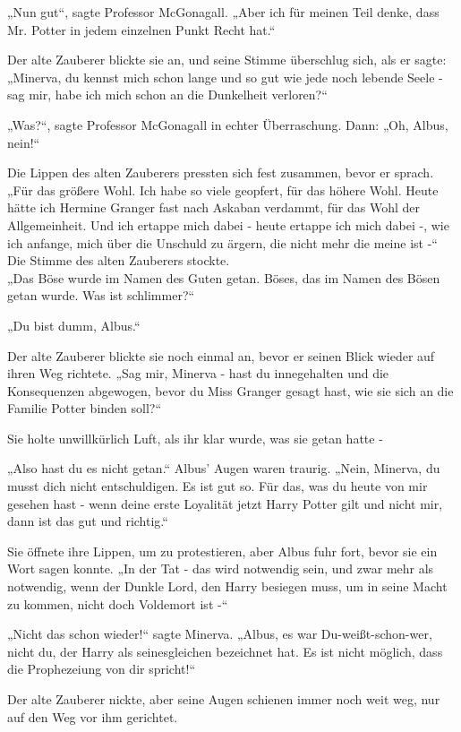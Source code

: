 {„Nun gut“, sagte Professor McGonagall. „Aber ich für meinen Teil denke, dass Mr. Potter in jedem einzelnen Punkt Recht hat.“

Der alte Zauberer blickte sie an, und seine Stimme überschlug sich, als er sagte: „Minerva, du kennst mich schon lange und so gut wie jede noch lebende Seele - sag mir, habe ich mich schon an die Dunkelheit verloren?“

„Was?“, sagte Professor McGonagall in echter Überraschung. Dann: „Oh, Albus, nein!“

Die Lippen des alten Zauberers pressten sich fest zusammen, bevor er sprach.\\ „Für das größere Wohl. Ich habe so viele geopfert, für das höhere Wohl. Heute hätte ich Hermine Granger fast nach Askaban verdammt, für das Wohl der Allgemeinheit. Und ich ertappe mich dabei - heute ertappe ich mich dabei -, wie ich anfange, mich über die Unschuld zu ärgern, die nicht mehr die meine ist -“\\ Die Stimme des alten Zauberers stockte.\\ „Das Böse wurde im Namen des Guten getan. Böses, das im Namen des Bösen getan wurde. Was ist schlimmer?“

„Du bist dumm, Albus.“

Der alte Zauberer blickte sie noch einmal an, bevor er seinen Blick wieder auf ihren Weg richtete. „Sag mir, Minerva - hast du innegehalten und die Konsequenzen abgewogen, bevor du Miss Granger gesagt hast, wie sie sich an die Familie Potter binden soll?“

Sie holte unwillkürlich Luft, als ihr klar wurde, was sie getan hatte -

„Also hast du es nicht getan.“ Albus' Augen waren traurig. „Nein, Minerva, du musst dich nicht entschuldigen. Es ist gut so. Für das, was du heute von mir gesehen hast - wenn deine erste Loyalität jetzt Harry Potter gilt und nicht mir, dann ist das gut und richtig.“

Sie öffnete ihre Lippen, um zu protestieren, aber Albus fuhr fort, bevor sie ein Wort sagen konnte. „In der Tat - das wird notwendig sein, und zwar mehr als notwendig, wenn der Dunkle Lord, den Harry besiegen muss, um in seine Macht zu kommen, nicht doch Voldemort ist -“

„Nicht das schon wieder!“ sagte Minerva. „Albus, es war Du-weißt-schon-wer, nicht du, der Harry als seinesgleichen bezeichnet hat. Es ist nicht möglich, dass die Prophezeiung von dir spricht!“

Der alte Zauberer nickte, aber seine Augen schienen immer noch weit weg, nur auf den Weg vor ihm gerichtet.

}
